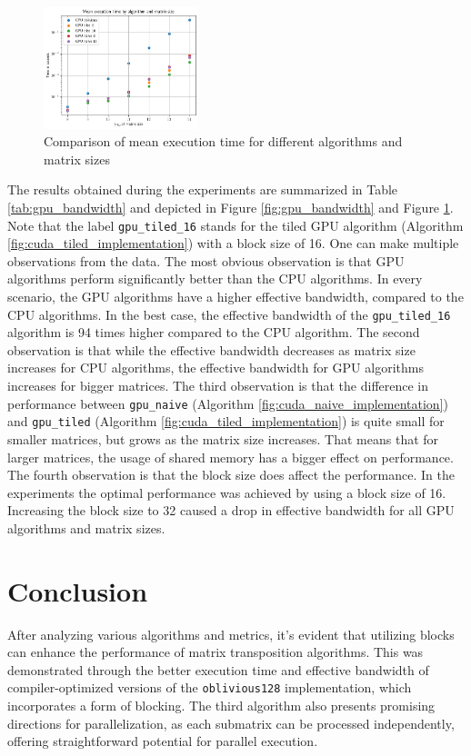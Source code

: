 \documentclass[conference]{IEEEtran}
\begin{document}
    \begin{figure}[htbp]
        \centering
        \includegraphics[width=0.4\textwidth]{./images/gpu_time.png}
        \caption{Comparison of mean execution time for different algorithms and matrix sizes}
        \label{fig:gpu_time}  
    \end{figure}
    The results obtained during the experiments are summarized in Table \ref{tab:gpu_bandwidth} and depicted in Figure \ref{fig:gpu_bandwidth} and Figure \ref{fig:gpu_time}. Note that the label \texttt{gpu\_tiled\_16} stands for the tiled GPU algorithm (Algorithm \ref{fig:cuda_tiled_implementation}) with a block size of 16. One can make multiple observations from the data. The most obvious observation is that GPU algorithms perform significantly better than the CPU algorithms. In every scenario, the GPU algorithms have a higher effective bandwidth, compared to the CPU algorithms. In the best case, the effective bandwidth of the \texttt{gpu\_tiled\_16} algorithm is 94 times higher compared to the CPU algorithm. 
    The second observation is that while the effective bandwidth decreases as matrix size increases for CPU algorithms, the effective bandwidth for GPU algorithms increases for bigger matrices.
    The third observation is that the difference in performance between \texttt{gpu\_naive} (Algorithm \ref{fig:cuda_naive_implementation}) and \texttt{gpu\_tiled} (Algorithm \ref{fig:cuda_tiled_implementation}) is quite small for smaller matrices, but grows as the matrix size increases. That means that for larger matrices, the usage of shared memory has a bigger effect on performance. The fourth observation is that the block size does affect the performance. In the experiments the optimal performance was achieved by using a block size of 16. Increasing the block size to 32 caused a drop in effective bandwidth for all GPU algorithms and matrix sizes.

    \section{Conclusion}
    After analyzing various algorithms and metrics, it's evident that utilizing blocks can enhance the performance of matrix transposition algorithms. This was demonstrated through the better execution time and effective bandwidth of compiler-optimized versions of the \texttt{oblivious128} implementation, which incorporates a form of blocking. The third algorithm also presents promising directions for parallelization, as each submatrix can be processed independently, offering straightforward potential for parallel execution.
\end{document}
